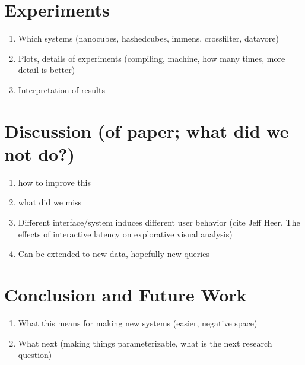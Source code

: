 \documentclass[journal]{vgtc}                %
\begin{document}
\section{Experiments}
\begin{enumerate}
	\item Which systems (nanocubes, hashedcubes, immens, crossfilter, datavore)
	\item Plots, details of experiments (compiling, machine, how many times, more detail is better)
	\item Interpretation of results
\end{enumerate}

\section{Discussion (of paper; what did we not do?)}
\begin{enumerate}
	\item how to improve this
	\item what did we miss
	\item Different interface/system induces different user behavior (cite Jeff Heer, The effects of interactive latency on explorative visual analysis)
	\item Can be extended to new data, hopefully new queries
\end{enumerate}

\section{Conclusion and Future Work}
\begin{enumerate}
	\item What this means for making new systems (easier, negative space)
	\item What next (making things parameterizable, what is the next research question)
\end{enumerate}
\end{document}
